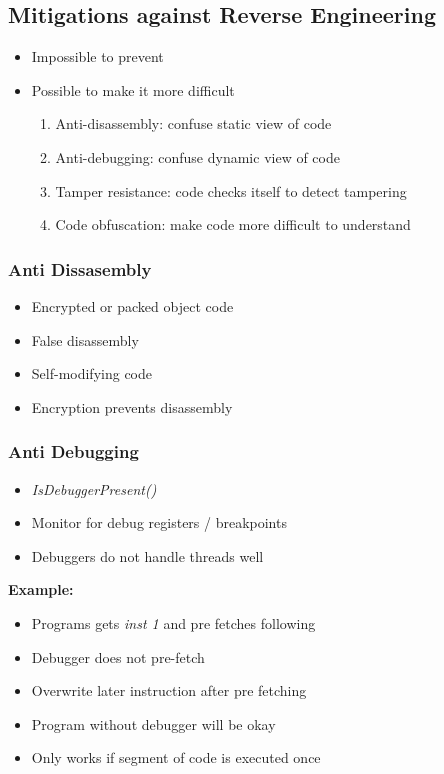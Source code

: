 \subsection{Mitigations against Reverse Engineering}
\begin{itemize}
    \item Impossible to prevent
    \item Possible to make it more difficult
    \begin{enumerate}
        \item Anti-disassembly: confuse static view of code
        \item Anti-debugging: confuse dynamic view of code
        \item Tamper resistance: code checks itself to detect tampering
        \item Code obfuscation: make code more difficult to understand
    \end{enumerate}
\end{itemize}

\columnbreak
\subsubsection{Anti Dissasembly}
\begin{itemize}
    \item Encrypted or packed object code
    \item False disassembly
    \item Self-modifying code
    \item Encryption prevents disassembly
\end{itemize}

\subsubsection{Anti Debugging}
\begin{itemize}
    \item \textit{IsDebuggerPresent()}
    \item Monitor for debug registers / breakpoints
    \item Debuggers do not handle threads well
\end{itemize}
\textbf{Example:}
\begin{itemize}
    \item Programs gets \textit{inst 1} and pre fetches following
    \item Debugger does not pre-fetch
    \item Overwrite later instruction after pre fetching
    \item Program without debugger will be okay
    \item Only works if segment of code is executed once
\end{itemize}

